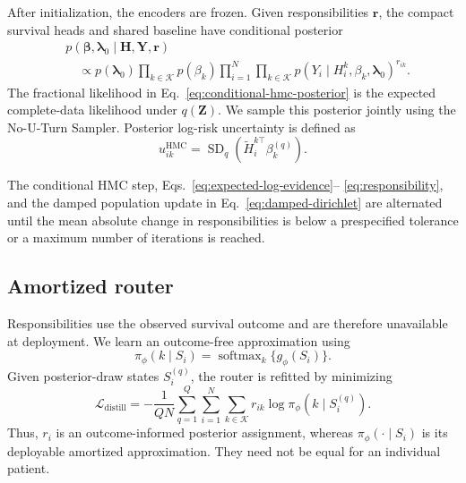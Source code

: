 After initialization, the encoders are frozen. Given responsibilities
$\boldsymbol r$, the compact survival heads and shared baseline have conditional
posterior
\begin{align}
&p(\boldsymbol\beta,\boldsymbol\lambda_0
      \mid\boldsymbol H,\boldsymbol Y,\boldsymbol r) \nonumber\\
&\quad\propto
 p(\boldsymbol\lambda_0)
 \prod_{k\in\mathcal K}p(\beta_k)
 \prod_{i=1}^{N}\prod_{k\in\mathcal K}
 p(Y_i\mid H_i^k,\beta_k,\boldsymbol\lambda_0)^{r_{ik}}.
\label{eq:conditional-hmc-posterior}
\end{align}
The fractional likelihood in Eq.~\eqref{eq:conditional-hmc-posterior} is the
expected complete-data likelihood under $q(\boldsymbol Z)$. We sample this
posterior jointly using the No-U-Turn Sampler. Posterior log-risk uncertainty is
defined as
\begin{equation}
    u_{ik}^{\mathrm{HMC}}
    =\operatorname{SD}_{q}\!\left(
       \widetilde H_i^{k\top}\beta_k^{(q)}
      \right).
\end{equation}

The conditional HMC step, Eqs.~\eqref{eq:expected-log-evidence}--
\eqref{eq:responsibility}, and the damped population update in
Eq.~\eqref{eq:damped-dirichlet} are alternated until the mean absolute change in
responsibilities is below a prespecified tolerance or a maximum number of
iterations is reached.

\subsection{Amortized router}

Responsibilities use the observed survival outcome and are therefore
unavailable at deployment. We learn an outcome-free approximation using
\begin{equation}
    \pi_\phi(k\mid S_i)
    =\operatorname{softmax}_k\{g_\phi(S_i)\}.
\end{equation}
Given posterior-draw states $S_i^{(q)}$, the router is refitted by minimizing
\begin{equation}
    \mathcal L_{\mathrm{distill}}
    =-\frac{1}{QN}
      \sum_{q=1}^{Q}\sum_{i=1}^{N}\sum_{k\in\mathcal K}
      r_{ik}\log\pi_\phi(k\mid S_i^{(q)}).
\label{eq:router-distillation}
\end{equation}
Thus, $r_i$ is an outcome-informed posterior assignment, whereas
$\pi_\phi(\cdot\mid S_i)$ is its deployable amortized approximation. They need
not be equal for an individual patient.

